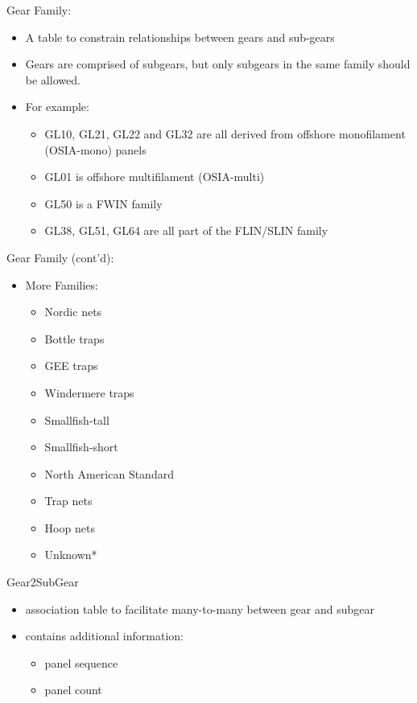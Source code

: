 \documentclass[bigger]{beamer}
\begin{document}
\begin{frame}[label=sec-9]{Gear Family:}
\begin{itemize}
\item A table to constrain relationships between gears and sub-gears
\item Gears are comprised of subgears, but only subgears in the same family
should be allowed.
\item For example:

\begin{itemize}
\item GL10, GL21, GL22 and GL32 are all derived from offshore
monofilament (OSIA-mono) panels

\item GL01 is offshore multifilament (OSIA-multi)

\item GL50 is a FWIN family

\item GL38, GL51, GL64 are all part of the FLIN/SLIN family
\end{itemize}
\end{itemize}
\end{frame}

\begin{frame}[label=sec-10]{Gear Family (cont'd):}
\begin{itemize}
\item More Families:
\begin{itemize}
\item Nordic nets
\item Bottle traps
\item GEE traps
\item Windermere traps
\item Smallfish-tall
\item Smallfish-short
\item North American Standard
\item Trap nets
\item Hoop nets
\item Unknown*
\end{itemize}
\end{itemize}
\end{frame}


\begin{frame}[label=sec-11]{Gear2SubGear}
\begin{itemize}
\item association table to facilitate many-to-many between gear and
subgear
\item contains additional information:
\begin{itemize}
\item panel sequence
\item panel count
\end{itemize}
\end{itemize}
\end{frame}
\end{document}
